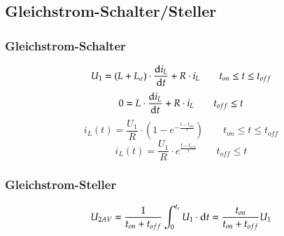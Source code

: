 \subsection{Gleichstrom-Schalter/Steller}
\subsubsection{Gleichstrom-Schalter}
\[ U_1=(L + L_{\sigma})\cdot \frac{\mathop{}\!\mathrm{d} i_L}{\mathop{}\!\mathrm{d} t}+R\cdot i_L \qquad t_{on} \leq t \leq t_{off}\]
\[ 0=L\cdot \frac{\mathop{}\!\mathrm{d} i_L}{\mathop{}\!\mathrm{d} t}+ R\cdot i_L \qquad t_{off}\leq t \]
\[ i_L(t)=\frac{U_1}{R}\cdot(1-e^{-\frac{t-t_{on}}{\tau}}) \qquad t_{on} \leq t \leq t_{off}\]
\[ i_L(t)=\frac{U_1}{R}\cdot e^{\frac{t-t_{off}}{\tau}} \qquad t_{off}\leq t \]
\subsubsection{Gleichstrom-Steller}
\[ U_{2AV}=\frac{1}{t_{on}+t_{off}}\int_{0}^{t_e}U_1\cdot \mathop{}\!\mathrm{d} t = \frac{t_{on}}{t_{on}+t_{off}}U_1 \]
\clearpage